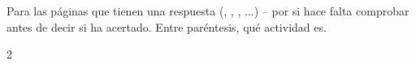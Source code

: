 \section*{\lblClave}

Para las páginas que tienen una respuesta (\lblClasifica, \lblUne,
\lblVF, \lblTrueque...) -- por si hace falta comprobar antes de decir si
ha acertado. Entre paréntesis, qué actividad es.

\begin{multicols}{2}
\footnotesize
\begin{itemize}[leftmargin=0mm, label={}, itemsep=2mm, topsep=0mm]

\end{itemize}
\end{multicols}
\newpage
